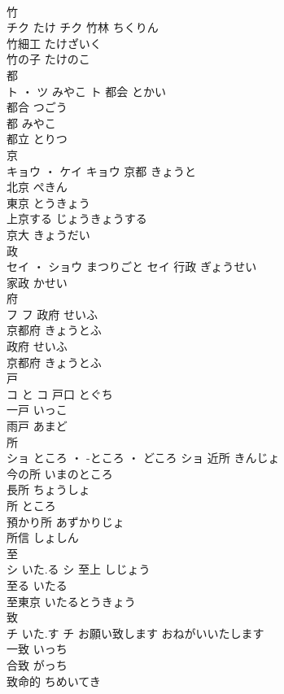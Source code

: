 \documentclass[8pt]{extreport}
\begin{document}
\begin{CJK}{UTF8}{min}
\\	竹	
\\	チク	たけ	チク	竹林	ちくりん	
\\	竹細工	たけざいく	
\\	竹の子	たけのこ	
\\	都	
\\	ト ・ ツ	みやこ	ト	都会	とかい	
\\	都合	つごう	
\\	都	みやこ	
\\	都立	とりつ	
\\	京	
\\	キョウ ・ ケイ		キョウ													京都	きょうと	
\\	北京	ぺきん	
\\	東京	とうきょう	
\\	上京する	じょうきょうする	
\\	京大	きょうだい	
\\	政	
\\	セイ ・ ショウ	まつりごと	セイ	行政	ぎょうせい	
\\	家政	かせい	
\\	府	
\\	フ		フ	政府	せいふ	
\\	京都府	きょうとふ	
\\	政府	せいふ	
\\	京都府	きょうとふ	
\\	戸	
\\	コ	と	コ	戸口	とぐち	
\\	一戸	いっこ	
\\	雨戸	あまど	
\\	所	
\\	ショ	ところ ・ -ところ ・ どころ	ショ	近所	きんじょ	
\\	今の所	いまのところ	
\\	長所	ちょうしょ	
\\	所	ところ	
\\	預かり所	あずかりじょ	
\\	所信	しょしん	
\\	至	
\\	シ	いた.る	シ	至上	しじょう	
\\	至る	いたる	
\\	至東京	いたるとうきょう	
\\	致	
\\	チ	いた.す	チ	お願い致します	おねがいいたします	
\\	一致	いっち	
\\	合致	がっち	
\\	致命的	ちめいてき	

\end{CJK}
\end{document}
